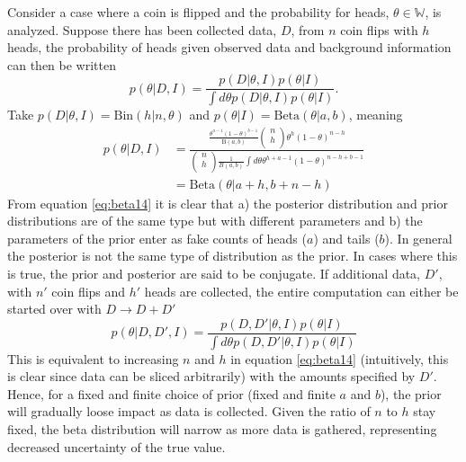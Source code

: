 \begin{example}
	Consider a case where a coin is flipped and the probability for heads, $\theta\in \mathbb{W}$, is analyzed. Suppose there has been collected data, $D$, from $n$ coin flips with $h$ heads, the probability of heads given observed data and background information can then be written
	\begin{equation}
		p(\theta|D,I) = \frac{p(D|\theta,I)p(\theta|I)}{\int d\theta p(D|\theta,I)p(\theta|I)}.
	\end{equation} 
	Take $p(D|\theta,I)=\text{Bin}(h|n,\theta)$ and $p(\theta|I)=\text{Beta}(\theta|a,b)$, meaning
	\begin{equation}
		\begin{split}
			p(\theta|D,I)&= \frac{\frac{\theta^{a-1}(1-\theta)^{b-1}}{\text{B}(a,b)} \begin{pmatrix}
					n\\
					h\\
				\end{pmatrix}\theta^h(1-\theta)^{n-h}}{\begin{pmatrix}
					n\\
					h\\
				\end{pmatrix}\frac{1}{B(a,b)}\int d\theta \theta^{h+a-1}(1-\theta)^{n-h+b-1}}\\
			& = \text{Beta}(\theta|a+h,b+n-h)
		\end{split}
		\label{eq:beta14}
	\end{equation}
	From equation \eqref{eq:beta14} it is clear that a) the posterior distribution and prior distributions are of the same type but with different parameters and b) the parameters of the prior enter as fake counts of heads ($a$) and tails ($b$). In general the posterior is not the same type of distribution as the prior. In cases where this is true, the prior and posterior are said to be conjugate. If additional data, $D'$, with $n'$ coin flips and $h'$ heads are collected, the entire computation can either be started over with $D\rightarrow D+D'$
	\begin{equation}
			p(\theta|D,D',I) = \frac{p(D,D'|\theta,I)p(\theta|I)}{\int d\theta p(D,D'|\theta,I)p(\theta|I)}
	\end{equation}
	This is equivalent to increasing $n$ and $h$ in equation \eqref{eq:beta14} (intuitively, this is clear since data can be sliced arbitrarily) with the amounts specified by $D'$.	Hence, for a fixed and finite choice of prior (fixed and finite $a$ and $b$), the prior will gradually loose impact as data is collected. Given the ratio of $n$ to $h$ stay fixed, the beta distribution will narrow as more data is gathered, representing decreased uncertainty of the true value.
\end{example}

